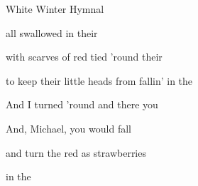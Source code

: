 \begin{SBSong}{White Winter Hymnal}
\begin{SBVerse}
	all swallowed in their  

	with scarves of red tied 'round their  

	to keep their little heads from fallin' in the  

	And I turned 'round and there you  

	And, Michael, you would fall 

	and turn the   red as strawberries 

	in the 
  \end{SBVerse}

\end{SBSong}